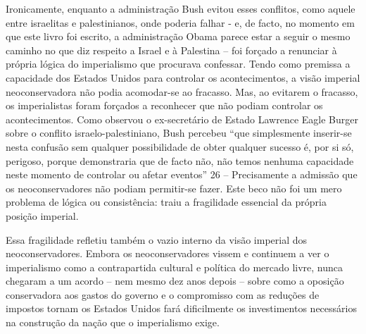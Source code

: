  
\par
 
Ironicamente, enquanto a administração Bush evitou esses conflitos, como aquele entre israelitas e palestinianos, onde poderia falhar - e, de facto, no momento em que este livro foi escrito, a administração Obama parece estar a seguir o mesmo caminho no que diz respeito a Israel e à Palestina – foi forçado a renunciar à própria lógica do imperialismo que procurava confessar. Tendo como premissa a capacidade dos Estados Unidos para controlar os acontecimentos, a visão imperial neoconservadora não podia acomodar-se ao fracasso. Mas, ao evitarem o fracasso, os imperialistas foram forçados a reconhecer que não podiam controlar os acontecimentos. Como observou o ex-secretário de Estado Lawrence Eagle Burger sobre o conflito israelo-palestiniano, Bush percebeu “que simplesmente inserir-se nesta confusão sem qualquer possibilidade de obter qualquer sucesso é, por si só, perigoso, porque demonstraria que de facto não, não temos nenhuma capacidade neste momento de controlar ou afetar eventos”
 {\color{blue} 26}  
– Precisamente a admissão que os neoconservadores não podiam permitir-se fazer. Este beco não foi um mero problema de lógica ou consistência: traiu a fragilidade essencial da própria posição imperial.
 
\par
 
Essa fragilidade refletiu também o vazio interno da visão imperial dos neoconservadores. Embora os neoconservadores vissem e continuem a ver o imperialismo como a contrapartida cultural e política do mercado livre, nunca chegaram a um acordo – nem mesmo dez anos depois – sobre como a oposição conservadora aos gastos do governo e o compromisso com as reduções de impostos tornam os Estados Unidos fará dificilmente os investimentos necessários na construção da nação que o imperialismo exige.
 
\par
 
